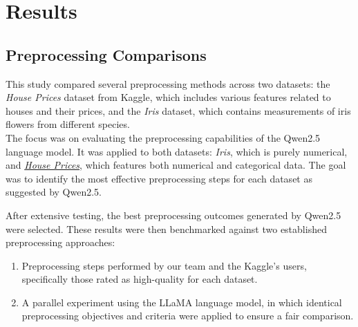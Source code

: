 \chapter{Results}

\section{Preprocessing Comparisons}
This study compared several preprocessing methods across two datasets: the
\textit{House Prices} dataset from Kaggle, which includes various features
related to houses and their prices, and the \textit{Iris} dataset, which
contains measurements of iris flowers from different species. \\ The focus was
on evaluating the preprocessing capabilities of the Qwen2.5 language model. It
was applied to both datasets: \textit{Iris}, which is purely numerical, and
\href{https://www.kaggle.com/competitions/house-prices-advanced-regression-techniques/data}{\textit{House
        Prices}}, which features both numerical and categorical data. The goal was to
identify the most effective preprocessing steps for each dataset as suggested
by Qwen2.5.

After extensive testing, the best preprocessing outcomes generated by Qwen2.5
were selected. These results were then benchmarked against two established
preprocessing approaches:

\begin{enumerate}
    \item Preprocessing steps performed by our team and the Kaggle's users, specifically
          those rated as high-quality for each dataset.
    \item A parallel experiment using the LLaMA language model, in which identical
          preprocessing objectives and criteria were applied to ensure a fair comparison.
\end{enumerate}

